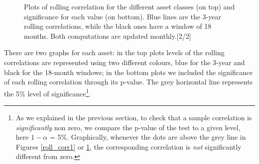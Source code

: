 \begin{figure}
\centering
	\noindent{}
	\noindent{}
	\caption[Plots of rolling correlations]{Plots of rolling correlation for the different asset classes (on top) and significance for each value (on bottom). Blue lines are the 3-year rolling correlations, while the black ones have a window of 18 months. Both computations are updated monthly.[2/2]}
	\label{roll_corr2}
\end{figure}


There are two graphs for each asset: in the top plots levels of the rolling correlations are represented using two different colours, blue for the 3-year and black for the 18-month windows; in the bottom plots we included the significance of each rolling correlation through its p-value. The grey horizontal line represents the 5\% level of significance\footnote{As we explained in the previous section, to check that a sample correlation is \textit{significantly} non zero, we compare the p-value of the test to a given level, here $1- \alpha$ = 5\%. Graphically, whenever the dots are above the grey line in Figures \ref{roll_corr1} or \ref{roll_corr2}, the corresponding correlation is \textit{not} significantly different from zero.}. 

